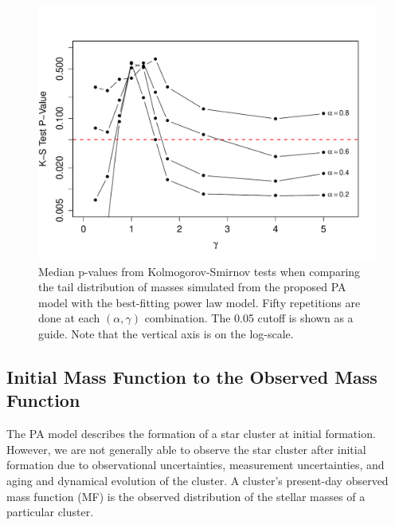 \documentclass[12pt]{article}
\begin{document}
\begin{figure}[htbp]
   \centering
\includegraphics[width = \textwidth]{figures/KSpowerlaw_1000_1.pdf}
\caption{Median p-values from Kolmogorov-Smirnov tests when comparing the tail distribution of masses simulated from
the proposed PA model with the best-fitting power law model. Fifty repetitions are done at each $(\alpha, \gamma)$
combination. The 0.05 cutoff is shown as a guide. Note that the vertical axis is on the log-scale.}
   \label{fig:KSpowerlaw1000}
\end{figure}



\subsection{Initial Mass Function to the Observed Mass Function} \label{sec:obs_challenges}
The PA model describes the formation of a star cluster at initial formation.  However, we are not generally able to observe the star cluster after initial formation due to observational uncertainties, measurement uncertainties, and aging and dynamical evolution of the cluster.  A cluster's present-day observed mass function (MF) is the observed distribution of the stellar masses of a particular cluster.
\end{document}

